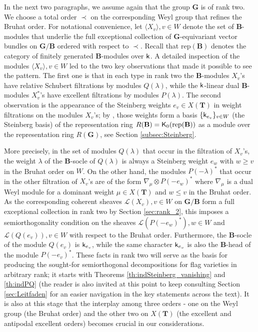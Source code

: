 \documentclass[sn-mathphys-num]{sn-jnl}%
\newcommand{\Ll}{\mathcal L}
\newcommand{\rep}{{\mathrm{rep}}}
\newcommand{\sk}{{\sf k}}
\newcommand{\sK}{{\sf K}}
\newcommand{\bg}{\mathbf G}
\newcommand{\fb}{\mathbf B}
\newcommand{\bt}{\mathbf T}
\theoremstyle{definition}
\begin{document}
In the next two paragraphs, we assume again that the group $\bg$ is of rank two. We choose a total order $\prec$ on the corresponding Weyl group that refines the Bruhat order.
For notational convenience, let $\langle X_v\rangle, v\in W$ denote the set of $\fb$-modules that underlie the full exceptional collection of $\bg$-equivariant vector bundles on $\bg/\fb$ ordered with respect to $\prec$. Recall that $\rep(\fb)$ denotes the category of finitely generated $\fb$-modules over $\sk$. A detailed inspection of the modules $\langle X_v\rangle, v\in W$ led to the two key observations that made it possible to see the pattern. The first one is that in each type in rank two the $\fb$-modules $X_v$'s have relative Schubert filtrations by modules $Q(\lambda)$, while the $\sk$-linear dual $\fb$-modules $X_v^*$'s have excellent filtrations by modules $P(\lambda)$. 
The second observation is the appearance of 
the Steinberg weights $e_v \in X( \bt)$ in weight filtrations on the modules $X_v$'s; by \cite{St}, those weights form a basis $\{\sk_{e_v}\}_{v\in W}$ (the Steinberg basis) of the representation ring $R( \fb)=\sK_0(\rep( \fb))$ as a module over the representation ring $R( \bg)$, see Section \ref{subsec:Steinberg}. 

More precisely, in the set of modules $Q(\lambda)$ that occur in the filtration of $X_v$'s, the weight $\lambda$ of the $\fb$-socle of $Q(\lambda)$ is always a Steinberg weight $e_w$ with $w\geq v$ in the Bruhat order on $W$. 
On the other hand, the  modules $P(-\lambda)^*$
that occur in the other filtration of $X_v$'s are of the form $\nabla_\mu\otimes P(-e_w)^*$ where $\nabla_\mu$ is a dual Weyl module for a  dominant weight $\mu\in X(\bt)$ and $w\leq v$ in the Bruhat order. As the corresponding coherent sheaves $\Ll(X_v), v\in W$ on $\bg/\fb$ form a full exceptional collection in rank two by Section \ref{sec:rank_2}, this imposes a semiorthogonality condition on the sheaves $\Ll(P(-e_w)^*), w\in W$ and $\Ll(Q(e_v)), v\in W$ with respect to the Bruhat order. Furthermore, the $\fb$-socle of the module $Q(e_v)$ is ${\sk }_{e_v}$, while the same character ${\sk }_{e_v}$ is also the $\fb$-head of the module $P(-e_v)^*$. These facts in rank two will serve as the basis for producing the sought-for semiorthogonal decompositions for flag varieties in arbitrary rank; it starts with Theorems \ref{th:indSteinberg_vanishing} and \ref{th:indPQ} (the reader is also invited at this point to keep consulting Section \ref{sec:Leitfaden} for an easier navigation in the key statements across the text). It is also at this stage that the interplay among three orders - one on the Weyl group (the Bruhat order) and the other two on $X(\bt)$ (the excellent and antipodal excellent orders) becomes crucial in our considerations.
\end{document}
